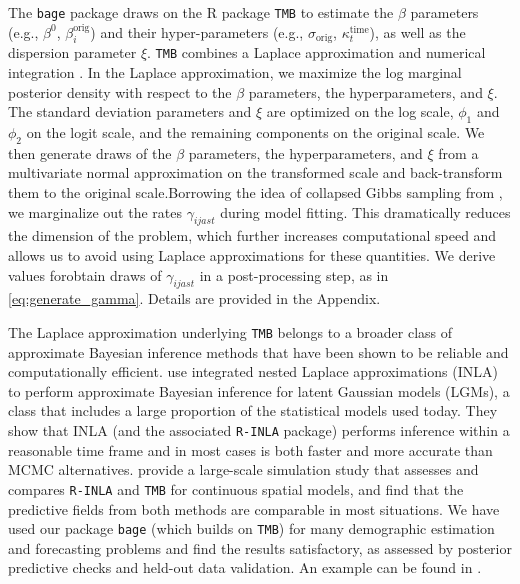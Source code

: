 \documentclass{article}
\begin{document}
The \texttt{bage} package draws on the R package \texttt{TMB} \citep{kristensen2016tmb} to estimate the $\beta$ parameters {\color{yellow}(e.g., $\beta^0$, $\beta_i^{\text{orig}}$)} and their hyper-parameters {\color{yellow}(e.g., $\sigma_{\text{orig}}$, $\kappa_t^{\text{time}}$)}, as well as the dispersion parameter 
$\xi$. \texttt{TMB} combines a Laplace approximation and numerical integration \citep{kristensen2016tmb,osgood2023statistical}. {\color{magenta}In the Laplace approximation, we maximize the log marginal posterior density with respect to the $\beta$ parameters, the hyperparameters, and $\xi$. The standard deviation parameters and 
$\xi$ are optimized on the log scale, $\phi_1$ and $\phi_2$ on the logit scale, and the remaining components on the original scale. We then generate draws of the $\beta$ parameters, the hyperparameters, and $\xi$ 
from a multivariate normal approximation on the transformed scale and back-transform them to the original scale.}{\color{yellow}Borrowing the idea of collapsed Gibbs sampling from \cite{liu1994collapsed}, we marginalize out the rates $\gamma_{ijast}$ during model fitting. This dramatically reduces the dimension of the problem, which further increases computational speed and allows us to avoid using Laplace approximations for these quantities.} We {\color{yellow}derive values for}{\color{magenta}obtain draws of} $\gamma_{ijast}$ in a post-processing step{\color{magenta}, as in \eqref{eq:generate_gamma}}. {\color{yellow}Details are provided in the Appendix.} 

{\color{magenta}The Laplace approximation underlying \texttt{TMB} belongs to a broader class of approximate Bayesian inference methods that have been shown to be reliable and computationally efficient. \citet{rue2017bayesian} use integrated nested Laplace approximations (INLA) to perform approximate Bayesian inference for latent Gaussian models (LGMs), a class that includes a large proportion of the statistical models used today. They show that INLA (and the associated \texttt{R-INLA} package) performs inference within a reasonable time frame and in most cases is both faster and more accurate than MCMC alternatives. \citet{osgood2023statistical} provide a large-scale simulation study that assesses and compares \texttt{R-INLA} and \texttt{TMB} for continuous spatial models, and find that the predictive fields from both methods are comparable in most situations. We have used our package \texttt{bage} (which builds on \texttt{TMB}) for many demographic estimation and forecasting problems and find the results satisfactory, as assessed by posterior predictive checks and held-out data validation. An example can be found in \citet{bryant2026estimating}.}
\end{document}
